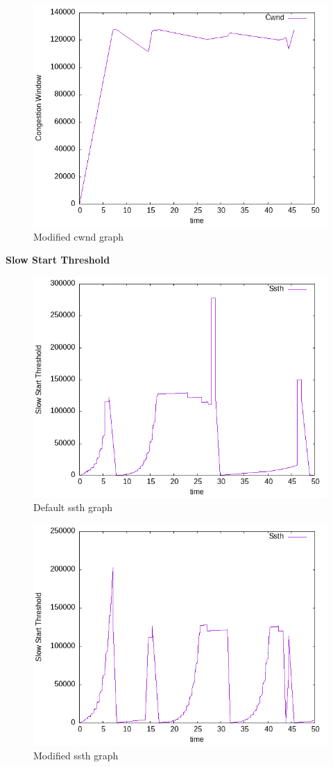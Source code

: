 \documentclass{article}[12pt]
\begin{document}
\begin{figure}[H]
	\centering
	\includegraphics[height=0.6\textwidth]{Pictures/rtt/130/m/cwnd_graph.png}
	\caption{Modified cwnd graph}
\end{figure}   

\newpage
\textbf{Slow Start Threshold}
\begin{figure}[H]
	\centering
	\includegraphics[height=0.6\textwidth]{Pictures/rtt/130/b/ssth_graph.png}
	\caption{Default ssth graph}
\end{figure}   


\begin{figure}[H]
	\centering
	\includegraphics[height=0.6\textwidth]{Pictures/rtt/130/m/ssth_graph.png}
	\caption{Modified ssth graph}
\end{figure}   
\end{document}
